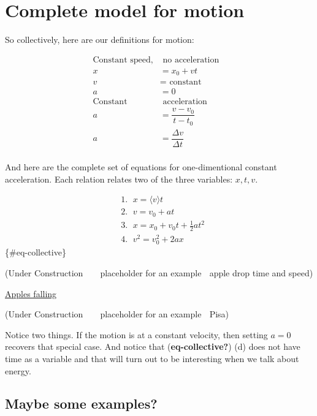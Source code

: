\documentclass[
]{book}
\begin{document}
\section{Complete model for motion}\label{sec-equationsofmotion}

So collectively, here are our definitions for motion:

\begin{align}
\text{Constant speed,}&\text{ no acceleration} \nonumber \\
x &= x_0 + vt \nonumber \\
v &= \text{ constant} \nonumber \\
a &= 0 \nonumber \\
\text{Constant}&\text{ acceleration}& \nonumber \\
a &=\dfrac{v-v_0}{t-t_0} \nonumber \\
a &= \dfrac{\Delta v}{\Delta t} \nonumber \\
\end{align}

And here are the complete set of equations for one-dimentional constant acceleration. Each relation relates two of the three variables: \(x, t, v\).

\begin{align}
& \text{1. } \; x = \langle v \rangle t \tag{a}  \\ 
& \text{2.  } \; v   = v_0 + at \tag{b}  \\
& \text{3. }  \; x   = x_0+v_0 t + \frac{1}{2} at^2 \tag{c} \\
& \text{4. }\; v^2   = v_0^2 + 2ax \tag{d}  
\end{align} \{\#eq-collective\}

(Under Construction 🚧~👷‍♂️ placeholder for an example 🔎 apple drop time and speed)

\href{./examples/_output/apple_motion.html}{Apples falling}

(Under Construction 🚧~👷‍♂️ placeholder for an example 🔎 Pisa)

Notice two things. If the motion is at a constant velocity, then setting \(a=0\) recovers that special case. And notice that (\textbf{eq-collective?}) (d) does not have time as a variable and that will turn out to be interesting when we talk about energy.

\subsection{Maybe some examples?}\label{maybe-some-examples}
\end{document}
